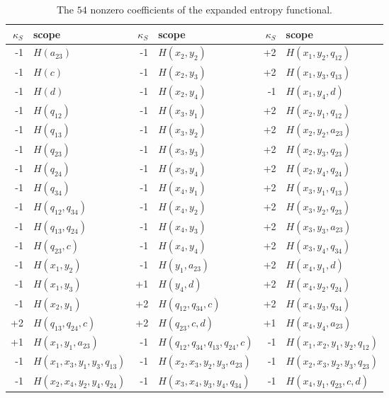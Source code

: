 \documentclass[journal]{IEEEtran}
\begin{document}
\begin{table}[!t]
\centering
\caption{The $54$ nonzero coefficients of the expanded entropy functional.}
\label{tab:coefficients}
\scriptsize
\setlength{\tabcolsep}{3.0pt}
\renewcommand{\arraystretch}{1.03}
\begin{tabular}{@{}r l@{\quad}r l@{\quad}r l@{}}
\hline
$\kappa_S$ & scope & $\kappa_S$ & scope & $\kappa_S$ & scope\\
\hline
-1 & $H(a_{23})$ & -1 & $H(x_{2},y_{2})$ & +2 & $H(x_{1},y_{2},q_{12})$\\
-1 & $H(c)$ & -1 & $H(x_{2},y_{3})$ & +2 & $H(x_{1},y_{3},q_{13})$\\
-1 & $H(d)$ & -1 & $H(x_{2},y_{4})$ & -1 & $H(x_{1},y_{4},d)$\\
-1 & $H(q_{12})$ & -1 & $H(x_{3},y_{1})$ & +2 & $H(x_{2},y_{1},q_{12})$\\
-1 & $H(q_{13})$ & -1 & $H(x_{3},y_{2})$ & +2 & $H(x_{2},y_{2},a_{23})$\\
-1 & $H(q_{23})$ & -1 & $H(x_{3},y_{3})$ & +2 & $H(x_{2},y_{3},q_{23})$\\
-1 & $H(q_{24})$ & -1 & $H(x_{3},y_{4})$ & +2 & $H(x_{2},y_{4},q_{24})$\\
-1 & $H(q_{34})$ & -1 & $H(x_{4},y_{1})$ & +2 & $H(x_{3},y_{1},q_{13})$\\
-1 & $H(q_{12},q_{34})$ & -1 & $H(x_{4},y_{2})$ & +2 & $H(x_{3},y_{2},q_{23})$\\
-1 & $H(q_{13},q_{24})$ & -1 & $H(x_{4},y_{3})$ & +2 & $H(x_{3},y_{3},a_{23})$\\
-1 & $H(q_{23},c)$ & -1 & $H(x_{4},y_{4})$ & +2 & $H(x_{3},y_{4},q_{34})$\\
-1 & $H(x_{1},y_{2})$ & -1 & $H(y_{1},a_{23})$ & +2 & $H(x_{4},y_{1},d)$\\
-1 & $H(x_{1},y_{3})$ & +1 & $H(y_{4},d)$ & +2 & $H(x_{4},y_{2},q_{24})$\\
-1 & $H(x_{2},y_{1})$ & +2 & $H(q_{12},q_{34},c)$ & +2 & $H(x_{4},y_{3},q_{34})$\\
+2 & $H(q_{13},q_{24},c)$ & +2 & $H(q_{23},c,d)$ & +1 & $H(x_{4},y_{4},a_{23})$\\
+1 & $H(x_{1},y_{1},a_{23})$ & -1 & $H(q_{12},q_{34},q_{13},q_{24},c)$ & -1 & $H(x_{1},x_{2},y_{1},y_{2},q_{12})$\\
-1 & $H(x_{1},x_{3},y_{1},y_{3},q_{13})$ & -1 & $H(x_{2},x_{3},y_{2},y_{3},a_{23})$ & -1 & $H(x_{2},x_{3},y_{2},y_{3},q_{23})$\\
-1 & $H(x_{2},x_{4},y_{2},y_{4},q_{24})$ & -1 & $H(x_{3},x_{4},y_{3},y_{4},q_{34})$ & -1 & $H(x_{4},y_{1},q_{23},c,d)$\\
\hline
\end{tabular}
\end{table}
\end{document}
